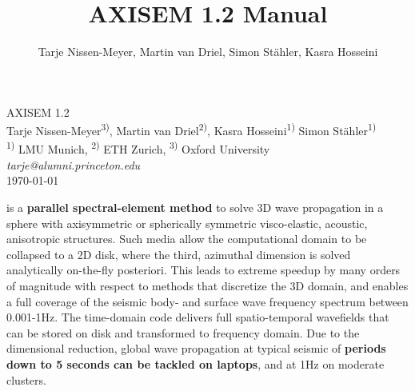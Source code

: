 \documentclass[11pt,letter,fleqn,english,notitlepage]{article}
\title{AXISEM 1.2 Manual}
\author{Tarje Nissen-Meyer, Martin van Driel, Simon Stähler, Kasra Hosseini}
\begin{document}
%
\pagestyle{fancy}
\thispagestyle{empty}
%
\begin{center}
{\LARGE {\sc AXISEM 1.2}}
\vspace{1.cm}\\
{\large 
Tarje Nissen-Meyer\textsuperscript{3)},
Martin van Driel\textsuperscript{2)},
Kasra Hosseini\textsuperscript{1)}
Simon St\"{a}hler\textsuperscript{1)}} \\
{\small \textsuperscript{1)} LMU Munich, \textsuperscript{2)} ETH Zurich, 
\textsuperscript{3)} Oxford University \\
\vspace*{0.2cm}
\textit{tarje@alumni.princeton.edu} \hspace*{0.75cm}
\vspace*{0.5cm}\\ 
\today}
\end{center}

\vspace*{1.6cm}
 is a \textbf{parallel spectral-element method} to solve
3D wave propagation in a sphere with axisymmetric or spherically symmetric
visco-elastic, acoustic, anisotropic structures. Such media allow the
computational domain to be collapsed to a 2D disk, where the third, azimuthal
dimension is solved analytically on-the-fly posteriori. This leads to extreme
speedup by many orders of magnitude with respect to methods that discretize the
3D domain, and enables a full coverage of the seismic body- and surface wave
frequency spectrum between 0.001-1Hz.  The time-domain code delivers full
spatio-temporal wavefields that can be stored on disk and transformed to
frequency domain. Due to the dimensional reduction, global wave propagation at
typical seismic of \textbf{periods down to 5 seconds can be tackled on
laptops}, and at 1Hz on moderate clusters.
\end{document}
